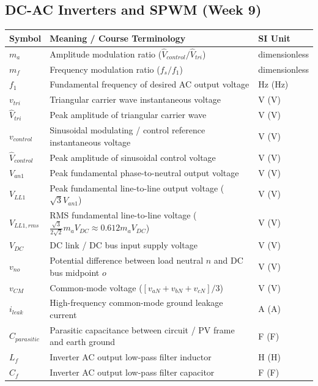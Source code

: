 \subsection{DC-AC Inverters and SPWM (Week 9)}
\begin{center}
\begin{tabular}{@{}lll@{}}
\toprule
\textbf{Symbol} & \textbf{Meaning / Course Terminology} & \textbf{SI Unit} \\
\midrule
$m_a$ & Amplitude modulation ratio ($\hat{V}_{control}/\hat{V}_{tri}$) & dimensionless \\
$m_f$ & Frequency modulation ratio ($f_s / f_1$) & dimensionless \\
$f_1$ & Fundamental frequency of desired AC output voltage & \si{\hertz} (Hz) \\
$v_{tri}$ & Triangular carrier wave instantaneous voltage & \si{\volt} (V) \\
$\hat{V}_{tri}$ & Peak amplitude of triangular carrier wave & \si{\volt} (V) \\
$v_{control}$ & Sinusoidal modulating / control reference instantaneous voltage & \si{\volt} (V) \\
$\hat{V}_{control}$ & Peak amplitude of sinusoidal control voltage & \si{\volt} (V) \\
$V_{an1}$ & Peak fundamental phase-to-neutral output voltage & \si{\volt} (V) \\
$V_{LL1}$ & Peak fundamental line-to-line output voltage ($\sqrt{3}V_{an1}$) & \si{\volt} (V) \\
$V_{LL1,rms}$ & RMS fundamental line-to-line voltage ($\frac{\sqrt{3}}{2\sqrt{2}} m_a V_{DC} \approx 0.612 m_a V_{DC}$) & \si{\volt} (V) \\
$V_{DC}$ & DC link / DC bus input supply voltage & \si{\volt} (V) \\
$v_{no}$ & Potential difference between load neutral $n$ and DC bus midpoint $o$ & \si{\volt} (V) \\
$v_{CM}$ & Common-mode voltage ($[v_{aN} + v_{bN} + v_{cN}]/3$) & \si{\volt} (V) \\
$i_{leak}$ & High-frequency common-mode ground leakage current & \si{\ampere} (A) \\
$C_{parasitic}$ & Parasitic capacitance between circuit / PV frame and earth ground & \si{\farad} (F) \\
$L_f$ & Inverter AC output low-pass filter inductor & \si{\henry} (H) \\
$C_f$ & Inverter AC output low-pass filter capacitor & \si{\farad} (F) \\

\end{tabular}
\end{center}
